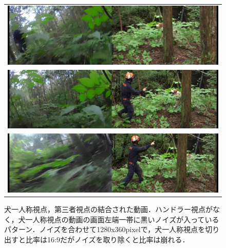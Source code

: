 \begin{figure}[htbp]
    \begin{tabular}{c}
      \begin{minipage}{0.18\hsize}
        \begin{center}
          \includegraphics[clip, width=12cm]{./Figures/2015_gonta_1.eps}
        \end{center}
      \end{minipage}
\\
      \begin{minipage}{0.18\hsize}
        \begin{center}
          \includegraphics[clip, width=12cm]{./Figures/2015_gonta_2.eps}
        \end{center}
      \end{minipage}
\\
      \begin{minipage}{0.18\hsize}
        \begin{center}
          \includegraphics[clip, width=12cm]{./Figures/2015_gonta_3.eps}
        \end{center}
      \end{minipage}
    \end{tabular}
    \caption{犬一人称視点，第三者視点の結合された動画．ハンドラー視点がなく，犬一人称視点の動画の画面左端一帯に黒いノイズが入っているパターン．ノイズを合わせて1280x360pixelで，犬一人称視点を切り出すと比率は16:9だがノイズを取り除くと比率は崩れる．}
    \label{noizy_movie}
\end{figure}






